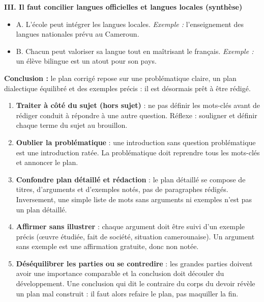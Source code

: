 \documentclass[11pt]{article}
\begin{document}
\begin{exoresolu}
\textbf{III. Il faut concilier langues officielles et langues locales (synthèse)}
\begin{itemize}
\item A. L'école peut intégrer les langues locales. \emph{Exemple :} l'enseignement des langues nationales prévu au Cameroun.
\item B. Chacun peut valoriser sa langue tout en maîtrisant le français. \emph{Exemple :} un élève bilingue est un atout pour son pays.
\end{itemize}

\textbf{Conclusion :} le plan corrigé repose sur une problématique claire, un plan dialectique équilibré et des exemples précis : il est désormais prêt à être rédigé.
\end{exoresolu}

\begin{attention}
\begin{enumerate}
\item \textbf{Traiter à côté du sujet (hors sujet)} : ne pas définir les mots-clés avant de rédiger conduit à répondre à une autre question. Réflexe : souligner et définir chaque terme du sujet au brouillon.
\item \textbf{Oublier la problématique} : une introduction sans question problématique est une introduction ratée. La problématique doit reprendre tous les mots-clés et annoncer le plan.
\item \textbf{Confondre plan détaillé et rédaction} : le plan détaillé se compose de titres, d'arguments et d'exemples notés, pas de paragraphes rédigés. Inversement, une simple liste de mots sans arguments ni exemples n'est pas un plan détaillé.
\item \textbf{Affirmer sans illustrer} : chaque argument doit être suivi d'un exemple précis (œuvre étudiée, fait de société, situation camerounaise). Un argument sans exemple est une affirmation gratuite, donc non notée.
\item \textbf{Déséquilibrer les parties ou se contredire} : les grandes parties doivent avoir une importance comparable et la conclusion doit découler du développement. Une conclusion qui dit le contraire du corps du devoir révèle un plan mal construit : il faut alors refaire le plan, pas maquiller la fin.
\end{enumerate}
\end{attention}

\newpage
\end{document}
